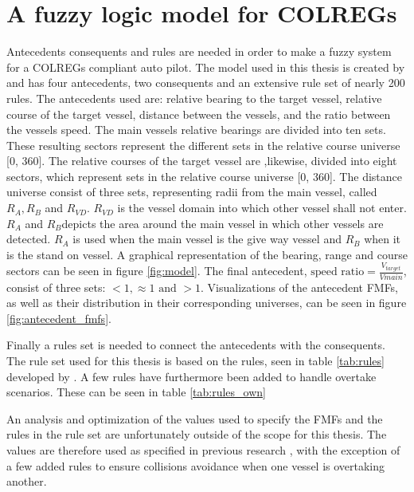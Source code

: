 \section{A fuzzy logic model for COLREGs}
\label{section:model}
Antecedents consequents and rules are needed in order to make a fuzzy system for a COLREGs compliant auto pilot. The model used in this thesis is created by \textcite{perera2012intelligent} and has four antecedents, two consequents and an extensive rule set of nearly 200 rules. The antecedents used are: relative bearing to the target vessel, relative course of the target vessel, distance between the vessels, and the ratio between the vessels speed. The main vessels relative bearings are divided into ten sets. These resulting sectors represent the different sets in the relative course universe [0, 360]. The relative courses of the target vessel are ,likewise, divided into eight sectors, which represent sets in the relative course universe [0, 360]. The distance universe consist of three sets, representing radii from the main vessel, called $R_A, R_B$ and $R_{VD}$. $R_{VD}$ is the vessel domain into which other vessel shall not enter. $R_A$ and $R_B $depicts the area around the main vessel in which other vessels are detected. $R_A$ is used when the main vessel is the give way vessel and $R_B$ when it is the stand on vessel. A graphical representation of the bearing, range and course sectors can be seen in figure \ref{fig:model}. The final antecedent, $\text{speed ratio} =\frac{V_{target}}{V{main}}$, consist of three sets: $<1, \approx1 \text{ and } >1$.
Visualizations of the antecedent FMFs, as well as their distribution in their corresponding universes, can be seen in figure \ref{fig:antecedent_fmfs}.

Finally a rules set is needed to connect the antecedents with the consequents. The rule set used for this thesis is based on  the rules, seen in table \ref{tab:rules} developed by \textcite{perera2012intelligent}. A few rules have furthermore been added to handle overtake scenarios. These can be seen in table \ref{tab:rules_own}

An analysis and optimization of the values used to specify the FMFs and the rules in the rule set are unfortunately outside of the scope for this thesis. The values are therefore used as specified in previous research \cite{perera2012intelligent}, with the exception of a few added rules to ensure collisions avoidance when one vessel is overtaking another.


